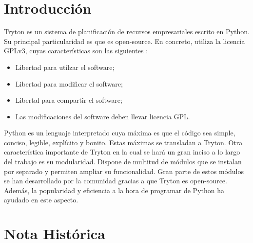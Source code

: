 \documentclass{article}
\begin{document}
\maketitle



\newpage
\tableofcontents
\newpage


\section{Introducción}

Tryton es un sistema de planificación de recursos empresariales escrito en Python. Su principal particularidad es que es open-source. En concreto, utiliza la licencia GPLv3, cuyas características son las siguientes \cite{gpl}:

\begin{itemize}
    \item Libertad para utilzar el software;
    \item Libertad para modificar el software;
    \item Libertal para compartir el software;
    \item Las modificaciones del software deben llevar licencia GPL.
\end{itemize}

Python es un lenguaje interpretado cuya máxima es que el código sea simple, conciso, legible, explícito y bonito. Estas máximas se transladan a Tryton. Otra característica importante de Tryton en la cual se hará un gran inciso a lo largo del trabajo es su modularidad. Dispone de multitud de módulos que se instalan por separado y permiten ampliar su funcionalidad. Gran parte de estos módulos se han desarrollado por la comunidad gracias a que Tryton es open-source. Además, la popularidad y eficiencia a la hora de programar de Python ha ayudado en este aspecto.

\section{Nota Histórica}
\end{document}
